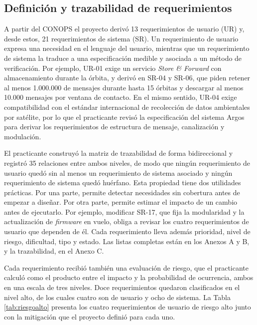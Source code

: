 \subsection{Definición y trazabilidad de requerimientos}

A partir del CONOPS el proyecto derivó 13 requerimientos de usuario (UR) y, desde estos, 21 requerimientos de sistema (SR). Un requerimiento de usuario expresa una necesidad en el lenguaje del usuario, mientras que un requerimiento de sistema la traduce a una especificación medible y asociada a un método de verificación. Por ejemplo, UR-01 exige un servicio \textit{Store \& Forward} con almacenamiento durante la órbita, y derivó en SR-04 y SR-06, que piden retener al menos 1.000.000 de mensajes durante hasta 15 órbitas y descargar al menos 10.000 mensajes por ventana de contacto. En el mismo sentido, UR-04 exige compatibilidad con el estándar internacional de recolección de datos ambientales por satélite, por lo que el practicante revisó la especificación del sistema Argos \parencite{clsargos} para derivar los requerimientos de estructura de mensaje, canalización y modulación.

El practicante construyó la matriz de trazabilidad de forma bidireccional y registró 35 relaciones entre ambos niveles, de modo que ningún requerimiento de usuario quedó sin al menos un requerimiento de sistema asociado y ningún requerimiento de sistema quedó huérfano. Esta propiedad tiene dos utilidades prácticas. Por una parte, permite detectar necesidades sin cobertura antes de empezar a diseñar. Por otra parte, permite estimar el impacto de un cambio antes de ejecutarlo. Por ejemplo, modificar SR-17, que fija la modularidad y la actualización de \textit{firmware} en vuelo, obliga a revisar los cuatro requerimientos de usuario que dependen de él. Cada requerimiento lleva además prioridad, nivel de riesgo, dificultad, tipo y estado. Las listas completas están en los Anexos A y B, y la trazabilidad, en el Anexo C.

Cada requerimiento recibió también una evaluación de riesgo, que el practicante calculó como el producto entre el impacto y la probabilidad de ocurrencia, ambos en una escala de tres niveles. Doce requerimientos quedaron clasificados en el nivel alto, de los cuales cuatro son de usuario y ocho de sistema. La Tabla \ref{tab:riesgoalto} presenta los cuatro requerimientos de usuario de riesgo alto junto con la mitigación que el proyecto definió para cada uno.


